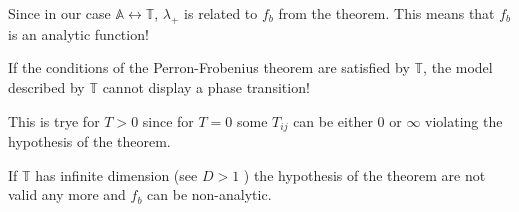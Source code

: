 \documentclass[../main/main.tex]{subfiles}
\begin{document}
\begin{remark}
Since in our case \( \mathbb{A} \leftrightarrow  \mathbb{T} \), \( \lambda _+ \) is related to \( f_b \) from the theorem. This means that \( f_b \) is an analytic function!
\end{remark}
If the conditions of the Perron-Frobenius theorem are satisfied by \( \mathbb{T} \), the model described by  \( \mathbb{T} \) cannot display a phase transition!
\begin{remark}
This is trye for \( T>0 \) since for \( T=0 \) some \( T_{ij} \) can be either 0 or \( \infty  \) violating the hypothesis of the theorem.

If \( \mathbb{T} \) has infinite dimension (see \( D>1 \) ) the hypothesis of the theorem are not valid any more and \( f_b \) can be non-analytic.
\end{remark}
\end{document}
